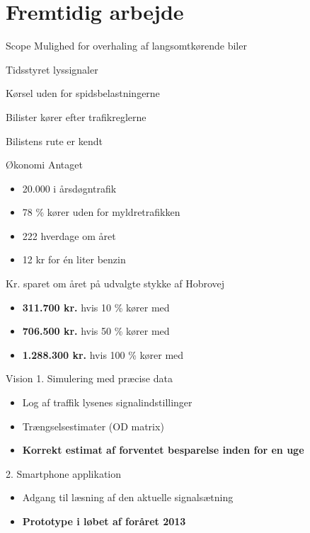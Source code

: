 \section{Fremtidig arbejde}
\begin{frame}{Scope}
Mulighed for overhaling af langsomtkørende biler
\vspace{4mm}

Tidsstyret lyssignaler
\vspace{4mm}

Kørsel uden for spidsbelastningerne
\vspace{4mm}

Bilister kører efter trafikreglerne

\vspace{4mm}
Bilistens rute er kendt

\end{frame}

\begin{frame}{Økonomi}%
Antaget
\begin{itemize}
\item 20.000 i årsdøgntrafik
\item 78 \% kører uden for myldretrafikken
\item 222 hverdage om året
\item 12 kr for én liter benzin
\end{itemize}
\vspace{5mm}
Kr. sparet om året på udvalgte stykke af Hobrovej
\begin{itemize}
\item \textbf{311.700 kr.} hvis 10 \% kører med \tech
\item \textbf{706.500 kr.} hvis 50 \% kører med \tech
\item \textbf{1.288.300 kr.} hvis 100 \% kører med \tech
\end{itemize}

\end{frame}


\begin{frame}{Vision}
1. Simulering med præcise data
	\begin{itemize}
	\item Log af traffik lysenes signalindstillinger
	\item Trængselsestimater (OD matrix)
	\end{itemize}
	\begin{itemize}
	\item \textbf{Korrekt estimat af forventet besparelse inden for en uge} %
	\end{itemize}
\vspace{5mm}

2. Smartphone applikation
	\begin{itemize}
	\item Adgang til læsning af den aktuelle signalsætning
	\end{itemize}
	\begin{itemize}
	\item \textbf{Prototype i løbet af foråret 2013}
	\end{itemize}
\end{frame}

